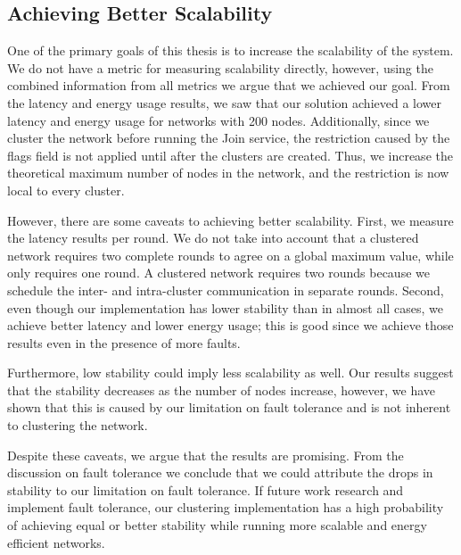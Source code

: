 \subsection{Achieving Better Scalability}
\begin{newtext}
One of the primary goals of this thesis is to increase the scalability of the \atwo{} system. We do not have a metric for measuring scalability directly, however, using the combined information from all metrics we argue that we achieved our goal. From the latency and energy usage results, we saw that our solution achieved a lower latency and energy usage for networks with 200 nodes. Additionally, since we cluster the network before running the Join service, the restriction caused by the flags field is not applied until after the clusters are created. Thus,  we increase the theoretical maximum number of nodes in the network, and the restriction is now local to every cluster.

However, there are some caveats to achieving better scalability. First, we measure the latency results per round. We do not take into account that a clustered network requires two complete rounds to agree on a global maximum value, while \atwo{} only requires one round. A clustered network requires two rounds because we schedule the inter- and intra-cluster communication in separate rounds. Second, even though our implementation has lower stability than \atwo{} in almost all cases, we achieve better latency and lower energy usage; this is good since we achieve those results even in the presence of more faults.

Furthermore, low stability could imply less scalability as well. Our results suggest that the stability decreases as the number of nodes increase, however, we have shown that this is caused by our limitation on fault tolerance and is not inherent to clustering the network.

Despite these caveats, we argue that the results are promising. From the discussion on fault tolerance we conclude that we could attribute the drops in stability to our limitation on fault tolerance. If future work research and implement fault tolerance, our clustering implementation has a high probability of achieving equal or better stability while running more scalable and energy efficient networks.
\end{newtext}

